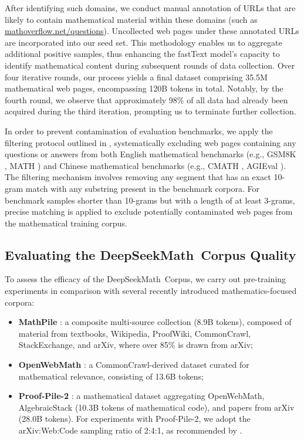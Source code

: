 After identifying such domains, we conduct manual annotation of URLs that are likely to contain mathematical material within these domains (such as \url{mathoverflow.net/questions}). Uncollected web pages under these annotated URLs are incorporated into our seed set. This methodology enables us to aggregate additional positive samples, thus enhancing the fastText model’s capacity to identify mathematical content during subsequent rounds of data collection. Over four iterative rounds, our process yields a final dataset comprising 35.5M mathematical web pages, encompassing 120B tokens in total. Notably, by the fourth round, we observe that approximately 98\% of all data had already been acquired during the third iteration, prompting us to terminate further collection.

In order to prevent contamination of evaluation benchmarks, we apply the filtering protocol outlined in \cite{deepseek-coder}, systematically excluding web pages containing any questions or answers from both English mathematical benchmarks (e.g., GSM8K \citep{gsm8k}, MATH \citep{MATH}) and Chinese mathematical benchmarks (e.g., CMATH \citep{wei2023cmath}, AGIEval \citep{agieval}). The filtering mechanism involves removing any segment that has an exact 10-gram match with any substring present in the benchmark corpora. For benchmark samples shorter than 10-grams but with a length of at least 3-grams, precise matching is applied to exclude potentially contaminated web pages from the mathematical training corpus.

\subsection{Evaluating the DeepSeekMath~Corpus Quality}

To assess the efficacy of the DeepSeekMath~Corpus, we carry out pre-training experiments in comparison with several recently introduced mathematics-focused corpora:

\begin{itemize}[topsep=0pt]
    \item \textbf{MathPile} \citep{mathpile}: a composite multi-source collection (8.9B tokens), composed of material from textbooks, Wikipedia, ProofWiki, CommonCrawl, StackExchange, and arXiv, where over 85\% is drawn from arXiv;
    \item \textbf{OpenWebMath} \citep{openwebmath}: a CommonCrawl-derived dataset curated for mathematical relevance, consisting of 13.6B tokens;
    \item \textbf{Proof-Pile-2} \citep{llemma}: a mathematical dataset aggregating OpenWebMath, AlgebraicStack (10.3B tokens of mathematical code), and papers from arXiv (28.0B tokens). For experiments with Proof-Pile-2, we adopt the arXiv:Web:Code sampling ratio of 2:4:1, as recommended by \cite{llemma}.
\end{itemize}

